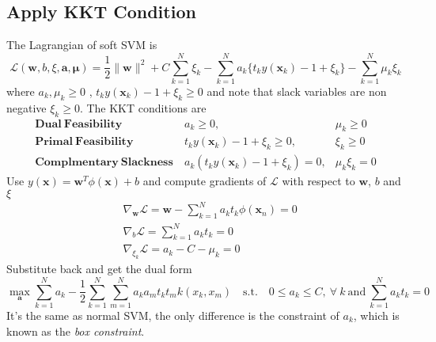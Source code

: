 \documentclass{article}
\begin{document}
        \subsection{Apply KKT Condition}
            The Lagrangian of soft SVM is
            \[
                \mathcal{L}(\mathbf{w},b,\xi,\mathbf{a},\mathbf{\mu}) = \frac{1}{2} \|\mathbf{w}\|^2 + C \sum_{k=1}^N \xi_k - \sum_{k=1}^N a_k \{ t_k y(\mathbf{x}_k) - 1 + \xi_k\} - \sum_{k=1}^N \mu_k \xi_k
            \]
            where $a_k,\mu_k \geq 0$ , $t_k y(\mathbf{x}_k) - 1 + \xi_k \geq 0$ and note that slack variables are non negative $\xi_k \geq 0$. The KKT conditions are
            \[
                \begin{array}{rll}
                    \mathbf{Dual~Feasibility~} & a_k \geq 0, & \mu_k \geq 0 \\
                    \mathbf{Primal~Feasibility~} & t_k y(\mathbf{x}_k) - 1 + \xi_k \geq 0, & \xi_k \geq 0 \\
                    \mathbf{Complmentary~Slackness~} & a_k (t_k y(\mathbf{x}_k) - 1 + \xi_k) = 0, & \mu_k \xi_k = 0
                \end{array}
            \]
            Use $y(\mathbf{x}) = \mathbf{w}^T \phi(\mathbf{x}) + b$ and compute  gradients of $\mathcal{L}$ with respect to $\mathbf{w}$, $b$ and $\xi$
            \begin{align*}
                & \nabla_{\mathbf{w}} \mathcal{L} = \mathbf{w} - \sum_{k=1}^N a_k t_k \phi(\mathbf{x}_n) = 0 \\
                & \nabla_b \mathcal{L} = \sum_{k=1}^N a_k t_k = 0 \\
                & \nabla_{\xi_k} \mathcal{L} = a_k - C - \mu_k = 0
            \end{align*}
            Substitute back and get the dual form
            \[
                \max_{\mathbf{a}} \sum_{k=1}^N a_k - \frac{1}{2} \sum_{k=1}^N \sum_{m=1}^N a_k a_m t_k t_m k(x_k, x_m) \mathrm{\quad s.t. \quad} 0 \leq a_k \leq C,~ \forall~k \mathrm{~and~} \sum_{k=1}^N a_k t_k = 0
            \]
            It's the same as normal SVM, the only difference is the constraint of $a_k$, which is known as the \textit{box constraint}.
\end{document}
